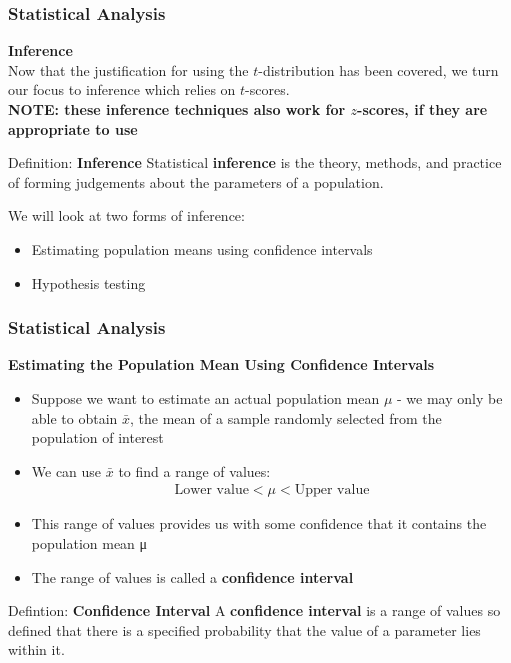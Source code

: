 \documentclass{beamer}
\begin{document}
\begin{frame}
\frametitle{Statistical Analysis}
\textbf{Inference}\\
\vspace{0.5cm}
Now that the justification for using the $t$-distribution has been covered, we turn our focus to inference which relies on $t$-scores.\\
\vspace{0.3cm}
\textbf{NOTE: these inference techniques also work for $z$-scores, if they are appropriate to use}
\vspace{0.5cm}
\begin{block}{Definition: \textbf{Inference}}
Statistical \textbf{inference} is the theory, methods, and practice of forming judgements about the parameters of a population.
\end{block}
\vspace{0.5cm}
We will look at two forms of inference:
\begin{itemize}
\item Estimating population means using confidence intervals
\item Hypothesis testing
\end{itemize}
\end{frame}
\begin{frame}
\frametitle{Statistical Analysis}
\textbf{Estimating the Population Mean Using Confidence Intervals}\\
\vspace{0.2cm}
\begin{itemize}
\item Suppose we want to estimate an actual population mean $\mu$ - we may only be able to obtain $\bar{x}$, the mean of a sample randomly selected from the population of interest
\vspace{0.2cm}
\item We can use $\bar{x}$ to find a range of values:
\begin{align*}
\textrm{Lower value}<\mu<\textrm{Upper value}
\end{align*}
\item This range of values provides us with some confidence that it contains the population mean μ
\vspace{0.2cm}
\item The range of values is called a \textbf{confidence interval}
\end{itemize}
\begin{block}{Defintion: \textbf{Confidence Interval}}
A \textbf{confidence interval} is a range of values so defined that there is a specified probability that the value of a parameter lies within it.
\end{block}
\end{frame}
\end{document}
